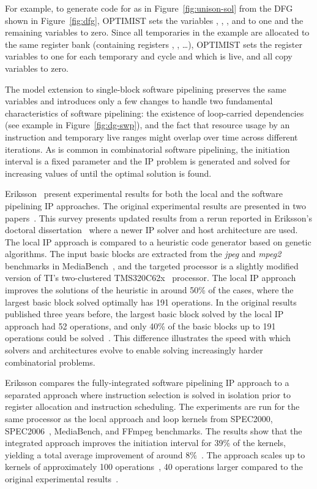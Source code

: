 \documentclass[acmsmall,authorversion,nonacm]{acmart}
\newcommand{\var}[2]{}
\begin{document}
For example, to generate code for  as in
Figure~\ref{fig:unison-sol} from the DFG shown in
Figure~\ref{fig:dfg}, OPTIMIST sets the variables
\var{s}{\loadInstruction{},0}, \var{s}{\addiInstruction{},1},
\var{s}{\addInstruction{},2}, and \var{s}{\jumpIfLTInstruction{},3} to
one and the remaining \var{s}{p,k} variables to zero.
Since all temporaries in the example are allocated to the same
register bank  (containing registers ,
, \dots), OPTIMIST sets the register variables
\var{a}{t,\code{R32},k} to one for each temporary  and cycle 
and which  is live, and all copy variables to zero.

The model extension to single-block software pipelining preserves the
same variables and introduces only a few changes to handle two
fundamental characteristics of software pipelining: the existence
of loop-carried dependencies (see example in Figure~\ref{fig:dg-swp}),
and the fact that resource usage by an instruction and temporary live
ranges might overlap over time across different iterations.
As is common in combinatorial software pipelining, the initiation
interval  is a fixed parameter and the IP problem is generated and
solved for increasing values of  until the optimal solution is
found.

Eriksson~\etal{} present experimental results for both the local and
the software pipelining IP approaches.
The original experimental results are presented in two
papers~\cite{Eriksson2008,Eriksson2012}.
This survey presents updated results from a rerun reported in
Eriksson's doctoral dissertation~\cite{Eriksson2011} where a newer IP
solver and host architecture are used.
The local IP approach is compared to a heuristic code generator based
on genetic algorithms.
The input basic blocks are extracted from the \emph{jpeg} and
\emph{mpeg2} benchmarks in MediaBench~\cite{Lee1997}, and the targeted
processor is a slightly modified version of TI's
two-clustered TMS320C62x~\cite{C62x} processor.
The local IP approach improves the solutions of the heuristic in
around 50\% of the cases, where the largest basic block solved
optimally has 191 operations.
In the original results published three years before, the largest
basic block solved by the local IP approach had 52 operations, and
only 40\% of the basic blocks up to 191 operations could be
solved~\cite{Eriksson2008}.
This difference illustrates the speed with which solvers and
architectures evolve to enable solving increasingly harder
combinatorial problems.

Eriksson compares the fully-integrated software pipelining IP approach
to a separated approach where instruction selection is solved in
isolation prior to register allocation and instruction scheduling.
The experiments are run for the same processor as the local approach
and loop kernels from SPEC2000, SPEC2006~\cite{CPU}, MediaBench, and
FFmpeg benchmarks.
The results show that the integrated approach improves the initiation
interval for 39\% of the kernels, yielding a total average improvement
of around 8\%~\cite[Chapter 8]{Eriksson2011}.
The approach scales up to kernels of approximately 100
operations~\cite[Chapter 4]{Eriksson2011}, 40 operations larger
compared to the original experimental results~\cite{Eriksson2012}.
\end{document}
